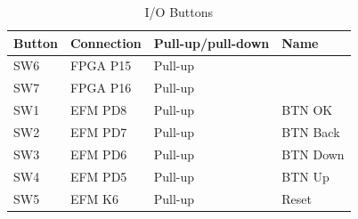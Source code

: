 \begin{table}[]
    \centering
    \label{tab:buttons}
    \begin{tabular}{llll}
        Button & Connection & Pull-up/pull-down & Name     \\
        \hline
        SW6    & FPGA P15   & Pull-up          &          \\
        SW7    & FPGA P16   & Pull-up          &          \\
        SW1    & EFM PD8    & Pull-up          & BTN OK   \\
        SW2    & EFM PD7    & Pull-up          & BTN Back \\
        SW3    & EFM PD6    & Pull-up          & BTN Down \\
        SW4    & EFM PD5    & Pull-up          & BTN Up   \\
        SW5    & EFM K6     & Pull-up          & Reset
    \end{tabular}
    \caption{I/O Buttons}
\end{table}

